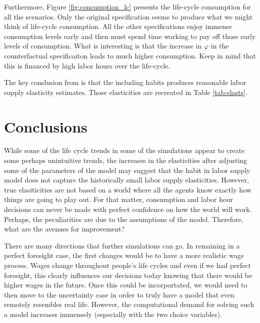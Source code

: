 \documentclass[ProjectMMD]{subfiles}
\begin{document}
\renewcommand{\figName}{consumption_lc}
\renewcommand{\figFile}{\figName}
\hypertarget{\figFile}{}

Furthermore, Figure \ref{fig:consumption_lc} presents the life-cycle consumption for all the scenarios. Only the original specification seems to produce what we might think of life-cycle consumption. All the other specifications enjoy immense consumption levels early and then must spend time working to pay off those early levels of consumption. What is interesting is that the increase in $\varphi$ in the counterfactual specificaiton leads to much higher consumption. Keep in mind that this is financed by high labor hours over the life-cycle. 


The key conslusion from \cite{bover1991relaxing} is that the including habits produces reasonable labor supply elasticity estimates. Those elasticities are recreated in Table \ref{tab:elasts}. 




\hypertarget{Conclusions}{}
\section{Conclusions}

While some of the life cycle trends in some of the simulations appear to create some perhaps unintuitive trends, the increases in the elasticities after adjusting some of the parameters of the model may suggest that the habit in labor supply model does not capture the historically small labor supply elasticities. However, true elasiticities are not based on a world where all the agents know exactly how things are going to play out. For that matter, consumption and labor hour decisions can never be made with perfect confidence on how the world will work. Perhaps, the peculiarities are due to the assumptions of the model. Therefore, what are the avenues for improvement?


There are many directions that further simulations can go. In remaining in a perfect foresight case, the first changes would be to have a more realistic wage process. Wages change throughout people's life cycles and even if we had perfect foresight, this clearly influences our decisions today knowing that there would be higher wages in the future. Once this could be incorportated, we would need to then move to the uncertainty case in order to truly have a model that even remotely resembles real life. However, the computational demand for solving such a model increases immensely (especially with the two choice variables).
\end{document}
